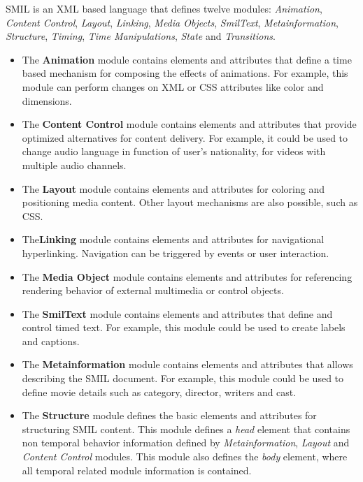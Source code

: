   \ac{SMIL} is an \ac{XML} based language that defines twelve modules: \emph{Animation}, \emph{Content Control}, \emph{Layout}, \emph{Linking}, \emph{Media Objects}, \emph{SmilText}, \emph{Metainformation}, \emph{Structure}, \emph{Timing}, \emph{Time Manipulations}, \emph{State} and \emph{Transitions}.


\begin{itemize}

  \item The \textbf{Animation} module contains elements and attributes that define a time based mechanism for composing the effects of animations. For example, this module can perform changes on \ac{XML} or \ac{CSS} attributes like color and dimensions.  

  \item The \textbf{Content Control} module contains elements and attributes that provide optimized alternatives for content delivery. For example, it could be used to change audio language in function of user's nationality, for videos with multiple audio channels.

  \item The \textbf{Layout} module contains elements and attributes for coloring and positioning media content. Other layout mechanisms are also possible, such as \ac{CSS}.

  \item The\textbf{Linking} module contains elements and attributes for navigational hyperlinking. Navigation can be triggered by events or user interaction.

  \item The \textbf{Media Object} module contains elements and attributes for referencing rendering behavior of external multimedia or control objects.

  \item The \textbf{SmilText} module contains elements and attributes that define and control timed text. For example, this module could be used to create labels and captions.

  \item The \textbf{Metainformation} module contains elements and attributes that allows describing the \ac{SMIL} document. For example, this module could be used to define movie details such as category, director, writers and cast.

  \item The \textbf{Structure} module defines the basic elements and attributes for structuring \ac{SMIL} content. This module defines a \emph{head} element that contains non temporal behavior information defined by  \emph{Metainformation}, \emph{Layout} and \emph{Content Control} modules. This module also defines the \emph{body} element, where all temporal related module information is contained.


\end{itemize}

